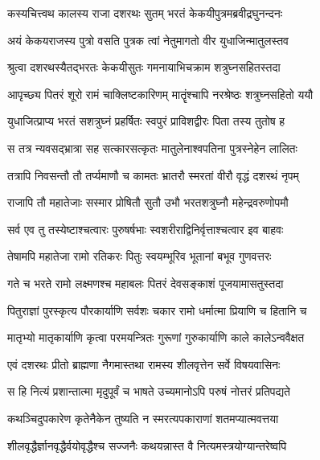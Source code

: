 

\twolineshloka
{कस्यचित्त्वथ कालस्य राजा दशरथः सुतम्}
{भरतं केकयीपुत्रमब्रवीद्रघुनन्दनः} %

\twolineshloka
{अयं केकयराजस्य पुत्रो वसति पुत्रक}
{त्वां नेतुमागतो वीर युधाजिन्मातुलस्तव} %

\twolineshloka
{श्रुत्वा दशरथस्यैतद्भरतः केकयीसुतः}
{गमनायाभिचक्राम शत्रुघ्नसहितस्तदा} %

\twolineshloka
{आपृच्छ्य पितरं शूरो रामं चाक्लिष्टकारिणम्}
{मातॄंश्चापि नरश्रेष्ठः शत्रुघ्नसहितो ययौ} %

\twolineshloka
{युधाजित्प्राप्य भरतं सशत्रुघ्नं प्रहर्षितः}
{स्वपुरं प्राविशद्वीरः पिता तस्य तुतोष ह} %

\twolineshloka
{स तत्र न्यवसद्भ्रात्रा सह सत्कारसत्कृतः}
{मातुलेनाश्वपतिना पुत्रस्नेहेन लालितः} %

\twolineshloka
{तत्रापि निवसन्तौ तौ तर्प्यमाणौ च कामतः}
{भ्रातरौ स्मरतां वीरौ वृद्धं दशरथं नृपम्} %

\twolineshloka
{राजापि तौ महातेजाः सस्मार प्रोषितौ सुतौ}
{उभौ भरतशत्रुघ्नौ महेन्द्रवरुणोपमौ} %

\twolineshloka
{सर्व एव तु तस्येष्टाश्चत्वारः पुरुषर्षभाः}
{स्वशरीराद्विनिर्वृत्ताश्चत्वार इव बाहवः} %

\twolineshloka
{तेषामपि महातेजा रामो रतिकरः पितुः}
{स्वयम्भूरिव भूतानां बभूव गुणवत्तरः} %

\twolineshloka
{गते च भरते रामो लक्ष्मणश्च महाबलः}
{पितरं देवसङ्काशं पूजयामासतुस्तदा} %

\twolineshloka
{पितुराज्ञां पुरस्कृत्य पौरकार्याणि सर्वशः}
{चकार रामो धर्मात्मा प्रियाणि च हितानि च} %

\twolineshloka
{मातृभ्यो मातृकार्याणि कृत्वा परमयन्त्रितः}
{गुरूणां गुरुकार्याणि काले कालेऽन्ववैक्षत} %

\twolineshloka
{एवं दशरथः प्रीतो ब्राह्मणा नैगमास्तथा}
{रामस्य शीलवृत्तेन सर्वे विषयवासिनः} %

\twolineshloka
{स हि नित्यं प्रशान्तात्मा मृदुपूर्वं च भाषते}
{उच्यमानोऽपि परुषं नोत्तरं प्रतिपद्यते} %

\twolineshloka
{कथञ्चिदुपकारेण कृतेनैकेन तुष्यति}
{न स्मरत्यपकाराणां शतमप्यात्मवत्तया} %

\twolineshloka
{शीलवृद्धैर्ज्ञानवृद्धैर्वयोवृद्धैश्च सज्जनैः}
{कथयन्नास्त वै नित्यमस्त्रयोग्यान्तरेष्वपि} %

